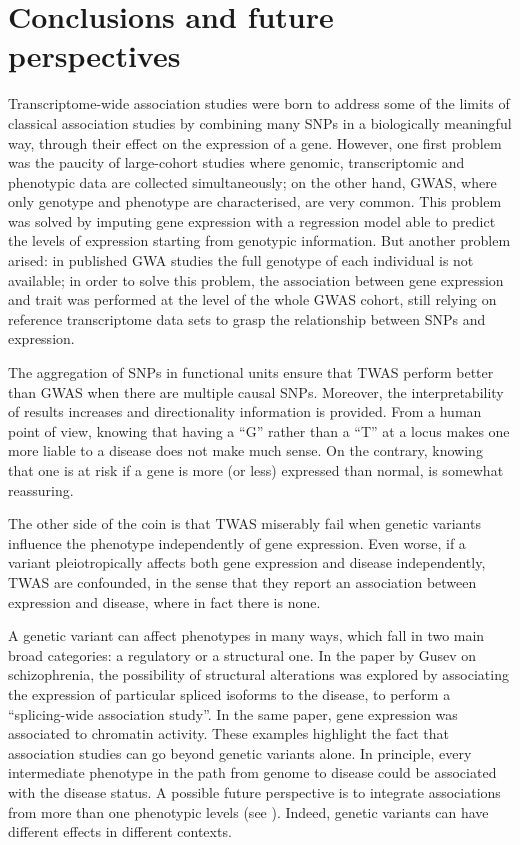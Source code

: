 \documentclass[../main.tex]{subfiles}
\begin{document}
\chapter{Conclusions and future perspectives}

Transcriptome-wide association studies were born to address some of the 
limits of classical association studies by combining many SNPs in a 
biologically meaningful way, \ie through their effect on the expression 
of a gene. However, one first problem was the paucity of large-cohort 
studies where genomic, transcriptomic and phenotypic data are collected 
simultaneously; on the other hand, GWAS, where only genotype and 
phenotype are characterised, are very common. This problem was solved by 
imputing gene expression with a regression model able to predict the 
levels of expression starting from genotypic information. But another 
problem arised: in published GWA studies the full genotype of each 
individual is not available; in order to solve this problem, the 
association between gene expression and trait was performed at the level 
of the whole GWAS cohort, still relying on reference transcriptome data 
sets to grasp the relationship between SNPs and expression.

The aggregation of SNPs in functional units ensure that TWAS perform 
better than GWAS when there are multiple causal SNPs. Moreover, the 
interpretability of results increases and directionality information is 
provided. From a human point of view, knowing that having a \enquote{G} 
rather than a \enquote{T} at a locus makes one more liable to a disease 
does not make much sense. On the contrary, knowing that one is at risk 
if a gene is more (or less) expressed than normal, is somewhat 
reassuring.

The other side of the coin is that TWAS miserably fail when genetic 
variants influence the phenotype independently of gene expression. Even 
worse, if a variant pleiotropically affects both gene expression and 
disease independently, TWAS are confounded, in the sense that they 
report an association between expression and disease, where in fact 
there is none.

A genetic variant can affect phenotypes in many ways, which fall in two 
main broad categories: a regulatory or a structural one. In the paper by 
Gusev \etal on schizophrenia, the possibility of structural alterations 
was explored by associating the expression of particular spliced 
isoforms to the disease, to perform a \enquote{splicing-wide association 
study}. In the same paper, gene expression was associated to chromatin 
activity. These examples highlight the fact that association studies can 
go beyond genetic variants alone. In principle, every intermediate 
phenotype in the path from genome to disease could be associated with 
the disease status. A possible future perspective is to integrate 
associations from more than one phenotypic levels (see 
). Indeed, genetic variants can have different 
effects in different contexts.
\end{document}

